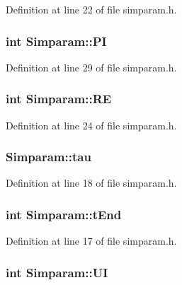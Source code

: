 Definition at line 22 of file simparam.\-h.

\hypertarget{struct_simparam_a1ae75207ff09bb7b8557fdccc2674e54}{
\subsubsection[{P\-I}]{\setlength{\rightskip}{0pt plus 5cm}int Simparam\-::\-P\-I}}\label{d6/d1d/struct_simparam_a1ae75207ff09bb7b8557fdccc2674e54}


Definition at line 29 of file simparam.\-h.

\hypertarget{struct_simparam_accc52cec0d22d7d80d8702127b4b896a}{
\subsubsection[{R\-E}]{\setlength{\rightskip}{0pt plus 5cm}int Simparam\-::\-R\-E}}\label{d6/d1d/struct_simparam_accc52cec0d22d7d80d8702127b4b896a}


Definition at line 24 of file simparam.\-h.

\hypertarget{struct_simparam_a09890730b950ccbd5df07ec0a6e7e0c5}{
\subsubsection[{tau}]{ Simparam\-::tau}}\label{d6/d1d/struct_simparam_a09890730b950ccbd5df07ec0a6e7e0c5}


Definition at line 18 of file simparam.\-h.

\hypertarget{struct_simparam_a7fd229effd7842736783206b9f54707d}{
\subsubsection[{t\-End}]{\setlength{\rightskip}{0pt plus 5cm}int Simparam\-::t\-End}}\label{d6/d1d/struct_simparam_a7fd229effd7842736783206b9f54707d}


Definition at line 17 of file simparam.\-h.

\hypertarget{struct_simparam_a0e30f7a3b2f3017fd8432dbe0af711d5}{
\subsubsection[{U\-I}]{\setlength{\rightskip}{0pt plus 5cm}int Simparam\-::\-U\-I}}\label{d6/d1d/struct_simparam_a0e30f7a3b2f3017fd8432dbe0af711d5}


